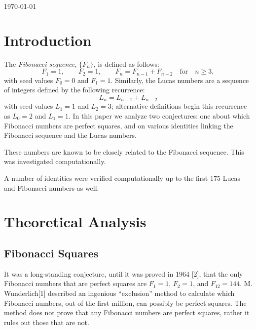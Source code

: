 \documentclass[11pt]{article}
\begin{document}
\begin{titlepage}

{\large \today}\\[3cm] 


 

\vfill 

\end{titlepage}

\tableofcontents
\newpage
\newpage

\section{Introduction}

The \textit{Fibonacci sequence}, $\{F_n\}$, is defined as follows: \[ F_1 = 1, \qquad F_2 = 1, \qquad F_n = F_{n - 1} + F_{n - 2} \quad \text{for} \quad n \geq 3, \] with seed values $F_{0} = 0$ and $F_{1} = 1$. Similarly, the Lucas numbers are a sequence of integers defined by the following recurrence: \[ L_{n} = L_{n-1} + L_{n-2}\] with seed values $L_{1} = 1$ and $L_{2} = 3$; alternative definitions begin this recurrence as $L_{0} = 2$ and $L_{1} = 1$. In this paper we analyze two conjectures: one about which Fibonacci numbers are perfect squares, and on various identities linking the Fibonacci sequence and the Lucas numbers.

These numbers are known to be closely related to the Fibonacci sequence. This was investigated computationally.

A number of identities were verified computationally up to the first 175 Lucas and Fibonacci numbers as well.


\section{Theoretical Analysis}
\subsection{Fibonacci Squares}
It was a long-standing conjecture, until it was proved in 1964 [2], that the only Fibonacci numbers that are perfect squares are $F_1 = 1$, $F_2 = 1$, and $F_{12} = 144$. M. Wunderlich[1] described an ingenious ``exclusion'' method to calculate which Fibonacci numbers, out of the first million, can possibly be perfect squares. The method does not prove that any Fibonacci numbers are perfect squares, rather it rules out those that are not.
\end{document}
